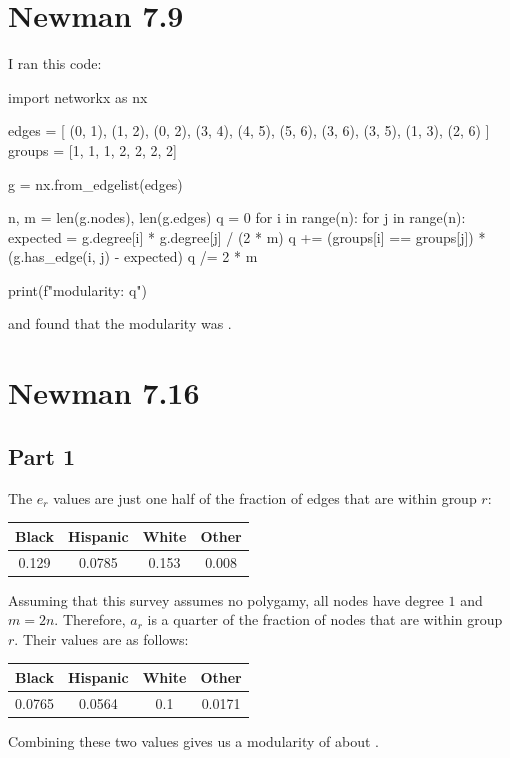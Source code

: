 \documentclass[12pt]{article}
\begin{document}
\section{Newman 7.9}

I ran this code:
\begin{python}
import networkx as nx

edges = [
    (0, 1), (1, 2), (0, 2), (3, 4), (4, 5),
    (5, 6), (3, 6), (3, 5), (1, 3), (2, 6)
]
groups = [1, 1, 1, 2, 2, 2, 2]

g = nx.from_edgelist(edges)

n, m = len(g.nodes), len(g.edges)
q = 0
for i in range(n):
    for j in range(n):
        expected = g.degree[i] * g.degree[j] / (2 * m)
        q += (groups[i] == groups[j]) * (g.has_edge(i, j) - expected)
q /= 2 * m

print(f"modularity: {q}")
\end{python}
and found that the modularity was .

\pagebreak

\section{Newman 7.16}

\subsection{Part 1}

The $e_r$ values are just one half of the fraction of edges that are within group $r$:
\begin{center}
      \begin{tabular}{|cccc|}
            \hline
            Black & Hispanic & White & Other \\
            \hline
            0.129 & 0.0785   & 0.153 & 0.008 \\
            \hline
      \end{tabular}
\end{center}
Assuming that this survey assumes no polygamy, all nodes have degree $1$ and $m=2n$.
Therefore, $a_r$ is a quarter of the fraction of nodes that are within group $r$.
Their values are as follows:
\begin{center}
      \begin{tabular}{|cccc|}
            \hline
            Black  & Hispanic & White & Other  \\
            \hline
            0.0765 & 0.0564   & 0.1   & 0.0171 \\
            \hline
      \end{tabular}
\end{center}
Combining these two values gives us a modularity of about .
\end{document}
